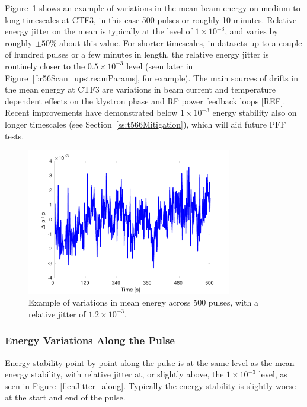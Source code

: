 Figure~\ref{f:enJitter_mean} shows an example of variations in the mean beam energy on medium to long timescales at CTF3, in this case 500 pulses or roughly 10 minutes. Relative energy jitter on the mean is typically at the level of \(1 \times 10^{-3}\), and varies by roughly \(\pm50\%\) about this value. For shorter timescales, in datasets up to a couple of hundred pulses or a few minutes in length, the relative energy jitter is routinely closer to the \(0.5 \times 10^{-3}\) level (seen later in Figure~\ref{f:r56Scan_upstreamParams}, for example). The main sources of drifts in the mean energy at CTF3 are variations in beam current and temperature dependent effects on the klystron phase and RF power feedback loops [REF]. Recent improvements have demonstrated below \(1 \times 10^{-3}\) energy stability also on longer timescales (see Section~\ref{ss:t566Mitigation}), which will aid future PFF tests.

\begin{figure}
  \centering
  \includegraphics[width=0.8\textwidth]{Figures/propagation/enJitter_mean}
  \caption{Example of variations in mean energy across 500 pulses, with a relative jitter of \(1.2\times 10^{-3}\).}
  \label{f:enJitter_mean}
\end{figure}

\subsubsection{Energy Variations Along the Pulse}

Energy stability point by point along the pulse is at the same level as the mean energy stability, with relative jitter at, or slightly above, the \(1 \times 10^{-3}\) level, as seen in Figure~\ref{f:enJitter_along}. Typically the energy stability is slightly worse at the start and end of the pulse.

